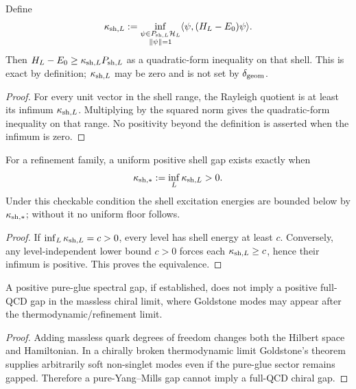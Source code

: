 \documentclass[12pt,a4paper]{article}
\providecommand{\deltageom}{\delta_{\rm geom}}
\begin{document}
\begin{lemma}
\label{p10:lem:scalar-shell-transfer-domination}
Define
\begin{equation}
\kappa_{{\rm sh},L}:=\inf_{\substack{\psi\in P_{{\rm sh},L}\mathcal H_L\\\|\psi\|=1}}
\langle\psi,(H_L-E_0)\psi\rangle.
\end{equation}
Then \(H_L-E_0\ge\kappa_{{\rm sh},L}P_{{\rm sh},L}\) as a quadratic-form inequality on that shell.  This is exact by definition; \(\kappa_{{\rm sh},L}\) may be zero and is not set by \(\deltageom\).
\end{lemma}
\begin{proof}
For every unit vector in the shell range, the Rayleigh quotient is at least its infimum $\kappa_{{\rm sh},L}$.  Multiplying by the squared norm gives the quadratic-form inequality on that range.  No positivity beyond the definition is asserted when the infimum is zero.
\end{proof}

\begin{theorem}
\label{p10:thm:uniform-scalar-shell-transfer-gap}
For a refinement family, a uniform positive shell gap exists exactly when
\begin{equation}
\kappa_{\rm sh,*}:=\inf_L\kappa_{{\rm sh},L}>0.
\end{equation}
Under this checkable condition the shell excitation energies are bounded below by \(\kappa_{\rm sh,*}\); without it no uniform floor follows.
\end{theorem}
\begin{proof}
If $\inf_L\kappa_{{\rm sh},L}=c>0$, every level has shell energy at least $c$.  Conversely, any level-independent lower bound $c>0$ forces each $\kappa_{{\rm sh},L}\ge c$, hence their infimum is positive.  This proves the equivalence.
\end{proof}

\begin{theorem}
\label{p10:thm:pure-ym-gap-not-full-qcd-chiral-gap}
A positive pure-glue spectral gap, if established, does not imply a positive full-QCD gap in the massless chiral limit, where Goldstone modes may appear after the thermodynamic/refinement limit.
\end{theorem}
\begin{proof}
Adding massless quark degrees of freedom changes both the Hilbert space and Hamiltonian.  In a chirally broken thermodynamic limit Goldstone's theorem supplies arbitrarily soft non-singlet modes even if the pure-glue sector remains gapped.  Therefore a pure-Yang--Mills gap cannot imply a full-QCD chiral gap.
\end{proof}
\end{document}
